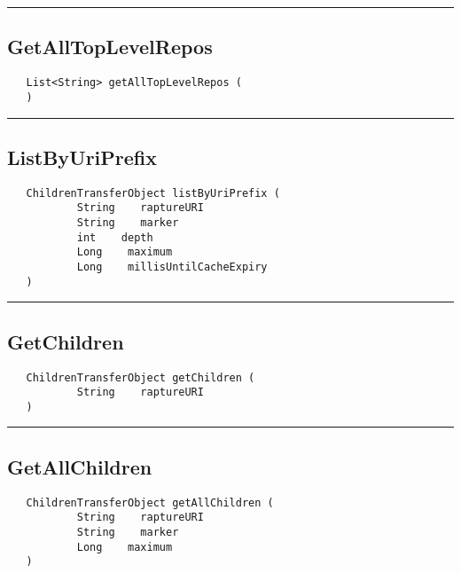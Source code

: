\rule{15cm}{2pt}
\subsection{GetAllTopLevelRepos}
\label{Api:GetAllTopLevelRepos}
\begin{verbatim}
   List<String> getAllTopLevelRepos (
   )
\end{verbatim}



\rule{15cm}{2pt}
\subsection{ListByUriPrefix}
\label{Api:ListByUriPrefix}
\begin{verbatim}
   ChildrenTransferObject listByUriPrefix (
           String    raptureURI
           String    marker
           int    depth
           Long    maximum
           Long    millisUntilCacheExpiry
   )
\end{verbatim}



\rule{15cm}{2pt}
\subsection{GetChildren}
\label{Api:GetChildren}
\begin{verbatim}
   ChildrenTransferObject getChildren (
           String    raptureURI
   )
\end{verbatim}



\rule{15cm}{2pt}
\subsection{GetAllChildren}
\label{Api:GetAllChildren}
\begin{verbatim}
   ChildrenTransferObject getAllChildren (
           String    raptureURI
           String    marker
           Long    maximum
   )
\end{verbatim}



